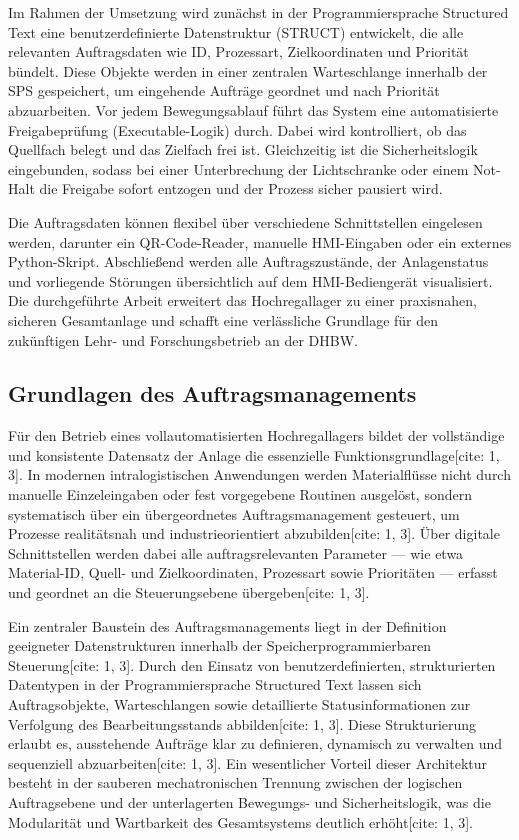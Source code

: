 Im Rahmen der Umsetzung wird zunächst in der Programmiersprache Structured Text eine benutzerdefinierte Datenstruktur (STRUCT) entwickelt, die alle relevanten Auftragsdaten wie ID, Prozessart, Zielkoordinaten und Priorität bündelt. Diese Objekte werden in einer zentralen Warteschlange innerhalb der SPS gespeichert, um eingehende Aufträge geordnet und nach Priorität abzuarbeiten. Vor jedem Bewegungsablauf führt das System eine automatisierte Freigabeprüfung (Executable-Logik) durch. Dabei wird kontrolliert, ob das Quellfach belegt und das Zielfach frei ist. Gleichzeitig ist die Sicherheitslogik eingebunden, sodass bei einer Unterbrechung der Lichtschranke oder einem Not-Halt die Freigabe sofort entzogen und der Prozess sicher pausiert wird.  

Die Auftragsdaten können flexibel über verschiedene Schnittstellen eingelesen werden, darunter ein QR-Code-Reader, manuelle HMI-Eingaben oder ein externes Python-Skript. Abschließend werden alle Auftragszustände, der Anlagenstatus und vorliegende Störungen übersichtlich auf dem HMI-Bediengerät visualisiert. Die durchgeführte Arbeit erweitert das Hochregallager zu einer praxisnahen, sicheren Gesamtanlage und schafft eine verlässliche Grundlage für den zukünftigen Lehr- und Forschungsbetrieb an der DHBW.  

\subsection{Grundlagen des Auftragsmanagements}

Für den Betrieb eines vollautomatisierten Hochregallagers bildet der vollständige und konsistente Datensatz der Anlage die essenzielle Funktionsgrundlage[cite: 1, 3]. In modernen intralogistischen Anwendungen werden Materialflüsse nicht durch manuelle Einzeleingaben oder fest vorgegebene Routinen ausgelöst, sondern systematisch über ein übergeordnetes Auftragsmanagement gesteuert, um Prozesse realitätsnah und industrieorientiert abzubilden[cite: 1, 3]. Über digitale Schnittstellen werden dabei alle auftragsrelevanten Parameter — wie etwa Material-ID, Quell- und Zielkoordinaten, Prozessart sowie Prioritäten — erfasst und geordnet an die Steuerungsebene übergeben[cite: 1, 3].

Ein zentraler Baustein des Auftragsmanagements liegt in der Definition geeigneter Datenstrukturen innerhalb der Speicherprogrammierbaren Steuerung[cite: 1, 3]. Durch den Einsatz von benutzerdefinierten, strukturierten Datentypen in der Programmiersprache Structured Text lassen sich Auftragsobjekte, Warteschlangen sowie detaillierte Statusinformationen zur Verfolgung des Bearbeitungsstands abbilden[cite: 1, 3]. Diese Strukturierung erlaubt es, ausstehende Aufträge klar zu definieren, dynamisch zu verwalten und sequenziell abzuarbeiten[cite: 1, 3]. Ein wesentlicher Vorteil dieser Architektur besteht in der sauberen mechatronischen Trennung zwischen der logischen Auftragsebene und der unterlagerten Bewegungs- und Sicherheitslogik, was die Modularität und Wartbarkeit des Gesamtsystems deutlich erhöht[cite: 1, 3].

